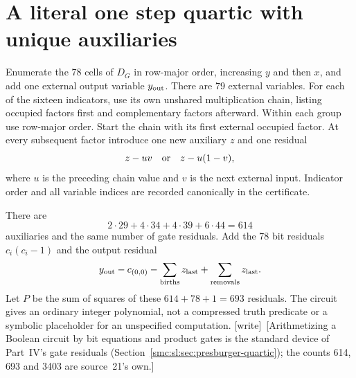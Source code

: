 \documentclass[11pt,letterpaper]{article}
\numberwithin{equation}{section}
\theoremstyle{definition}
\theoremstyle{remark}
\newcommand{\wtag}{\textup{[write]}}
\begin{document}
\section{A literal one step quartic with unique auxiliaries}\label{smc:bp:sec:quartic}
Enumerate the 78 cells of $D_G$ in row-major order, increasing $y$ and then $x$, and add one external output variable $y_{\rm out}$. There are 79 external variables. For each of the sixteen indicators, use its own unshared multiplication chain, listing occupied factors first and complementary factors afterward. Within each group use row-major order. Start the chain with its first external occupied factor. At every subsequent factor introduce one new auxiliary $z$ and one residual
\begin{equation}\label{smc:bp:eq:gates}
z-uv\quad\hbox{or}\quad z-u(1-v),
\end{equation}
where $u$ is the preceding chain value and $v$ is the next external input. Indicator order and all variable indices are recorded canonically in the certificate.

There are
\begin{equation}\label{smc:bp:eq:aux}
2\cdot29+4\cdot34+4\cdot39+6\cdot44=614
\end{equation}
auxiliaries and the same number of gate residuals. Add the 78 bit residuals $c_i(c_i-1)$ and the output residual
\begin{equation}\label{smc:bp:eq:outres}
y_{\rm out}-c_{(0,0)}-\sum_{\rm births}z_{\rm last}+\sum_{\rm removals}z_{\rm last}.
\end{equation}
Let $P$ be the sum of squares of these $614+78+1=693$ residuals. The circuit gives an ordinary integer polynomial, not a compressed truth predicate or a symbolic placeholder for an unspecified computation.
\wtag\ [Arithmetizing a Boolean circuit by bit equations and product gates is the standard device of Part~IV's gate residuals (Section~\ref{smc:sl:sec:presburger-quartic}); the counts 614, 693 and 3403 are source~21's own.]
\end{document}
